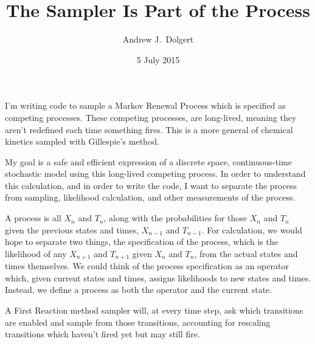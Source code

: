 \documentclass{article}
\title{The Sampler Is Part of the Process}
\author{Andrew J.\ Dolgert}
\date{5 July 2015}
\begin{document}
\maketitle

I'm writing code to sample a Markov Renewal Process
which is specified as competing processes. These competing
processes, are long-lived, meaning they aren't redefined
each time something fires. This is a more general
of chemical kinetics sampled with Gillespie's method.

My goal is a safe and efficient expression of a
discrete space, continuous-time stochastic model using
this long-lived competing process. In order to understand
this calculation, and in order to write the code,
I want to separate the process from sampling, likelihood
calculation, and other measurements of the process.

A process is all $X_n$ and $T_n$, along with the
probabilities for those $X_n$ and $T_n$ given the previous
states and times, $X_{n-1}$ and $T_{n-1}$.
For calculation, we would hope to separate two things,
the specification of the process, which is the likelihood
of any $X_{n+1}$ and $T_{n+1}$ given $X_n$ and $T_n$,
from the actual states and times themselves.
We could think of the process specification as an
operator which, given current states and times, 
assigns likelihoods to new states and times.
Instead, we define a process as both the operator
and the current state.


A First Reaction method sampler will, at every time
step, ask which transitions are enabled and sample
from those transitions, accounting for rescaling
transitions which haven't fired yet but may still fire.
\end{document}
